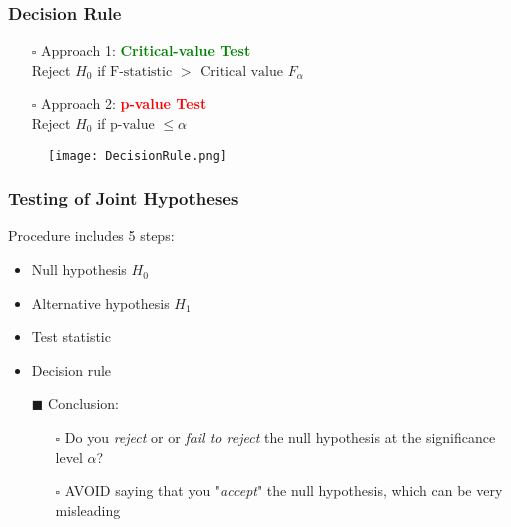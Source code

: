 \documentclass[11pt, xcolor=x11names,compress]{beamer}
\begin{document}
\begin{frame}[fragile,t]
\frametitle{Decision Rule}
\begin{itemize}
    \item [$\square$] Approach 1: \textcolor{green}{\textbf{Critical-value Test}}\\
\quad Reject $H_0$ if $\text{F-statistic } > \text{ Critical value } F_\alpha$\\
   \item [$\square$] Approach 2: \textcolor{red}{\textbf{p-value Test}}\\
\quad Reject $H_0$ if $\text{p-value }\leq \alpha$
\end{itemize}
\begin{figure}
    \centering
\texttt{[image: DecisionRule.png]}\\
    \caption{}
\end{figure}
\end{frame}

\begin{frame}[fragile,t]
\linespread{1.3}
\frametitle{Testing of Joint Hypotheses}

Procedure includes 5 steps:
\begin{itemize}
    \item Null hypothesis $H_0$
    \item Alternative hypothesis $H_1$
    \item Test statistic
    \item Decision rule
    \item [$\blacksquare$] Conclusion:
    \begin{itemize}
        \item [$\square$] Do you \textit{reject} or or \textit{fail to reject} the null hypothesis at the significance level $\alpha$?
        \item [$\square$] AVOID saying that you "\textit{accept}" the null hypothesis, which can be very misleading
    \end{itemize}
\end{itemize}
\hyperlink{Back}{}
\end{frame}
\end{document}
